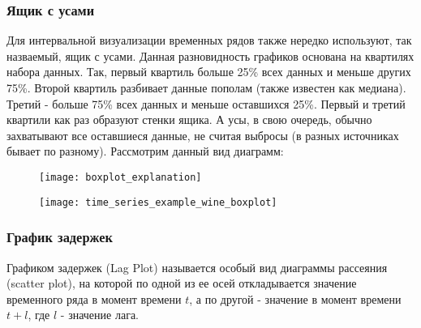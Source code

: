 \subsubsection{Ящик с усами}

Для интервальной визуализации временных рядов также нередко используют, так 
назваемый, ящик с усами. Данная разновидность графиков основана на 
квартилях набора данных. Так, первый квартиль больше 25\% всех данных и 
меньше других 75\%. Второй квартиль разбивает данные пополам (также известен 
как медиана). Третий - больше 75\% всех данных и меньше оставшихся 25\%. Первый 
и третий квартили как раз образуют стенки ящика. А
\guillemotleft усы\guillemotright {}, в свою очередь, обычно
захватывают все оставшиеся данные, не считая 
выбросы (в разных источниках бывает по разному). Рассмотрим данный вид диаграмм:

\begin{figure}[h!]
    \centering
    \texttt{[image: boxplot\_explanation]}
    \label{fig:boxplot_explanation}
\end{figure}

\newpage

\begin{figure}[h!]
    \centering
    \texttt{[image: time\_series\_example\_wine\_boxplot]}
    \label{fig:time_series_example_wine_boxplot}
\end{figure}

\subsubsection{График задержек}
Графиком задержек (Lag Plot) называется особый вид диаграммы рассеяния (scatter plot), 
на которой по одной из ее осей откладывается значение временного ряда в момент времени 
$t$, а по другой - значение в момент времени $t + l$, где $l$ - значение лага.

